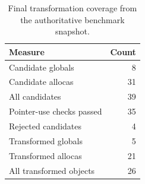 \begin{table}[t]
\centering
\caption{Final transformation coverage from the authoritative benchmark snapshot.}
\label{tab:coverage}
\small
\begin{tabular}{lr}
\toprule
Measure & Count \\
\midrule
Candidate globals & 8 \\
Candidate allocas & 31 \\
All candidates & 39 \\
Pointer-use checks passed & 35 \\
Rejected candidates & 4 \\
Transformed globals & 5 \\
Transformed allocas & 21 \\
All transformed objects & 26 \\
\bottomrule
\end{tabular}
\end{table}
